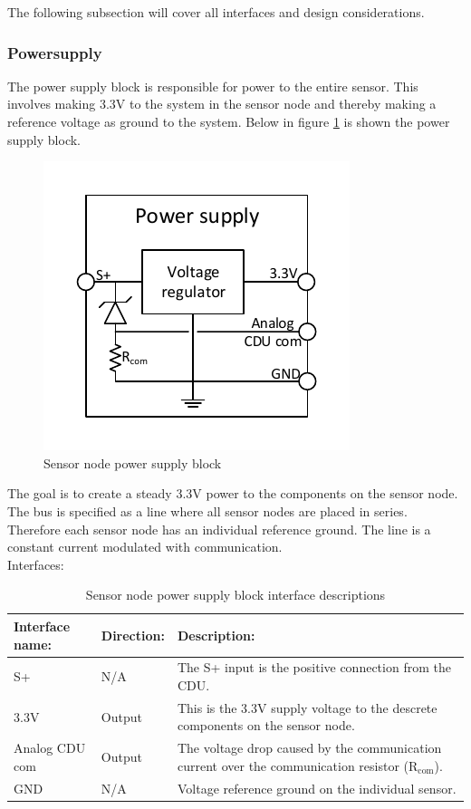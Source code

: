 The following subsection will cover all interfaces and design considerations.

\subsubsection{Powersupply}
The power supply block is responsible for power to the entire sensor. This involves making 3.3V to the system in the sensor node and thereby making a reference voltage as ground to the system. Below in figure \ref{fig:SN_PS_FIGURE} is shown the power supply block.

\begin{figure}[H]
	\centering
	\includegraphics[width=.5\textwidth]{billeder/powersupply_detailed_sn}
	\caption{Sensor node power supply block}
	\label{fig:SN_PS_FIGURE}
\end{figure} 

The goal is to create a steady 3.3V power to the components on the sensor node. The bus is specified as a line where all sensor nodes are placed in series. Therefore each sensor node has an individual reference ground. The line is a constant current modulated with communication.\\
Interfaces:
\begin{table}[H]
	\centering
	\begin{tabular}{|p{3cm} |p{2cm} | p{8cm}| }
		\hline
		Interface name:	& Direction: 		& Description: \\ \hline
		S+ 				& N/A				& The S+ input is the positive connection from the CDU. \\ \hline
		3.3V			& Output			& This is the 3.3V supply voltage to the descrete components on the sensor node. \\ 	\hline
		Analog CDU com  & Output			& The voltage drop caused by the communication current over the communication resistor (R$_{\text{com}}$).\\ \hline
		GND				& N/A				& Voltage reference ground on the individual sensor.\\\hline 
	\end{tabular}
	\caption{Sensor node power supply block interface descriptions}
\end{table}

